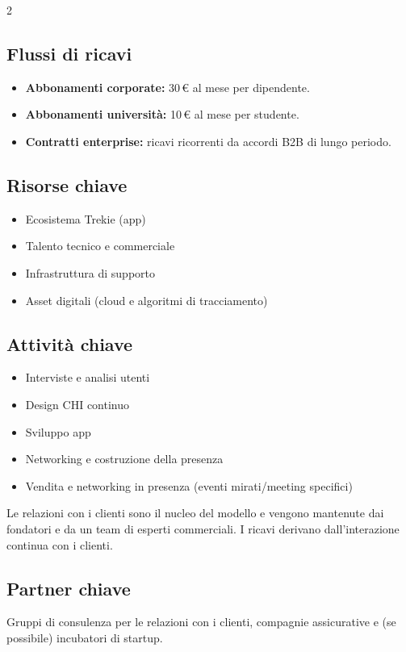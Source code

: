 \documentclass[10pt,a4paper]{scrartcl}
\begin{document}
\begin{multicols*}{2}
\subsection*{Flussi di ricavi}
\begin{itemize}
  \item \textbf{Abbonamenti corporate:} 30\,€ al mese per dipendente.
  \item \textbf{Abbonamenti università:} 10\,€ al mese per studente.
  \item \textbf{Contratti enterprise:} ricavi ricorrenti da accordi B2B di lungo periodo.
\end{itemize}

\subsection*{Risorse chiave}
\begin{itemize}
  \item Ecosistema Trekie (app)
  \item Talento tecnico e commerciale
  \item Infrastruttura di supporto
  \item Asset digitali (cloud e algoritmi di tracciamento)
\end{itemize}

\subsection*{Attività chiave}
\begin{itemize}
  \item Interviste e analisi utenti
  \item Design CHI continuo
  \item Sviluppo app
  \item Networking e costruzione della presenza
  \item Vendita e networking in presenza (eventi mirati/meeting specifici)
\end{itemize}
Le relazioni con i clienti sono il nucleo del modello e vengono mantenute dai fondatori e da un team di esperti commerciali. I ricavi derivano dall’interazione continua con i clienti.

\subsection*{Partner chiave}
Gruppi di consulenza per le relazioni con i clienti, compagnie assicurative e (se possibile) incubatori di startup.


\end{multicols*}
\end{document}
